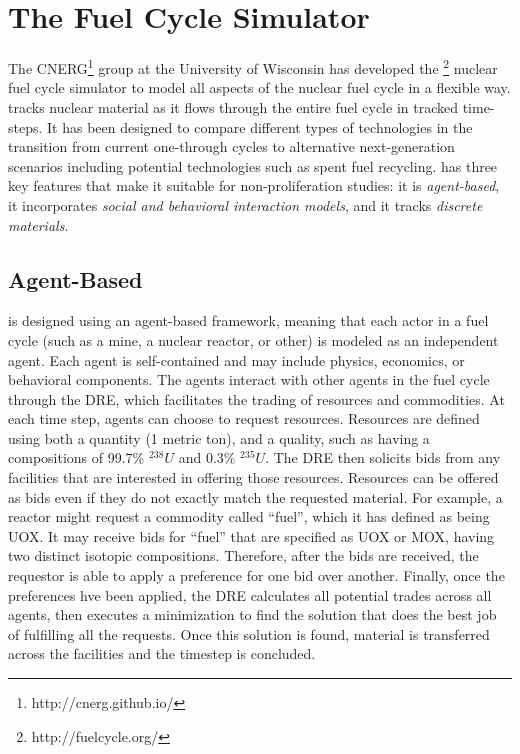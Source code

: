 \section{The \Cyclus Fuel Cycle Simulator}
\label{s_methods}

The \gls{CNERG}\footnote{http://cnerg.github.io/} group at the University of Wisconsin has developed the \Cyclus\footnote{http://fuelcycle.org/} nuclear fuel cycle simulator to model all aspects of the nuclear fuel cycle in a flexible way\cite{cyclus_v1_0,cyclus_v1_2,cyclus_v1_3}.  \Cyclus tracks nuclear material as it flows through the entire fuel cycle in tracked time-steps. It has been designed to compare different types of technologies in the transition from current one-through cycles to alternative next-generation scenarios including potential technologies such as spent fuel recycling. \Cyclus has three key features that make it suitable for non-proliferation studies: it is \emph{agent-based}, it incorporates \emph{social and behavioral interaction models}, and it tracks \emph{discrete materials}.

\subsection{Agent-Based}
\Cyclus is designed using an agent-based framework, meaning that each actor in a fuel cycle (such as a mine, a nuclear reactor, or other) is modeled as an independent agent\cite{jennings2000agent, taylor2014agent}. Each agent is self-contained and may include physics, economics, or behavioral components\cite{huff_transactions_2011,gidden_global_2013,gidden_thesis_2015}.  The agents interact with other agents in the fuel cycle through the \gls{DRE}, which facilitates the trading of resources and commodities\cite{gidden_physor_2014}.  At each time step, agents can choose to request resources.  Resources are defined using both a quantity (1 metric ton), and a quality, such as having a compositions of 99.7\% $^{238}U$ and 0.3\% $^{235}U$.  The \gls{DRE} then solicits bids from any facilities that are interested in offering those resources. Resources can be offered as bids even if they do not exactly match the requested material. For example, a reactor might request a commodity called ``fuel'', which it has defined as being \gls{UOX}.  It may receive bids for ``fuel'' that are specified as \gls{UOX} or \gls{MOX}, having two distinct isotopic compositions. Therefore, after the bids are received, the requestor is able to apply a preference for one bid over another. Finally, once the preferences hve been applied, the \gls{DRE} calculates all potential trades across all agents, then executes a minimization to find the solution that does the best job of fulfilling all the requests.  Once this solution is found, material is transferred across the facilities and the timestep is concluded.

